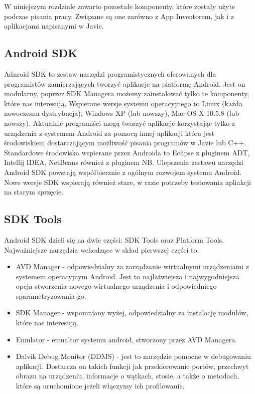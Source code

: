 W niniejszym rozdziale zawarto pozostałe komponenty, które zostały użyte podczas pisania pracy. Związane są one zarówno z App Inventorem, jak i z aplikacjami napisanymi w Javie.

\subsection{Android SDK}

Adnroid SDK to zestaw narzędzi programistycznych oferowanych dla programistów zamierzających tworzyć aplikacje na platformę Android. Jest on modularny, poprzez SDK Managera możemy zainstalować tylko te komponenty, które nas interesują.
Wspierane wersje systemu operacyjnego to Linux (każda nowoczesna dystrybucja), Windows XP (lub nowszy), Mac OS X 10.5.8 (lub nowszy). Aktualnie programiści mogą tworzyć aplikacje korzystając tylko z urządzenia z systemem Android za pomocą innej aplikacji która jest środowiskiem dostarczającym możliwość pisania programów w Javie lub C++. Standardowe środowiska wspierane przez Androida to Eclipse z pluginem ADT, Intellij IDEA, NetBeans również z pluginem NB.\cite{android:53} Ulepszenia zestawu narzędzi Android SDK powstają współbierznie z ogólnym rozwojem systemu Android. Nowe wersje SDK wspierają również stare, w razie potrzeby testowania apliakcji na starym sprzęcie. \cite{android:54}
 
\subsection{SDK Tools}

Android SDK dzieli się na dwie części: SDK Tools oraz Platform Tools. Najważniejsze narzędzia wchodzące w skład pierwszej części to:
\begin{itemize}
\item AVD Manager - odpowiedzialny za zarządzanie wirtualnymi urządzeniami z systemem operacyjnym Android. Jest to najłatwiejsza i najwygodniejsza opcja stworzenia nowego wirtualnego urządzenia i odpowiedniego sparametryzowania go.
\item SDK Manager - wspomniany wyżej, odpowiedzialny za instalację modułów, które nas interesują.
\item Emulator - emualtor systemu android, stworzony przez AVD Managera.
\item Dalvik Debug Monitor (DDMS) \label{ddms}- jest to narzędzie pomocne w debugowaniu aplikacji. Dostarcza on takich funkcji jak przekierowanie portów, przechwyt obrazu na urządzeniu, informacje o wątkach, stosie, a także o metodach, które są uruchomione jeżeli włączymy ich profilowanie.
\end{itemize}

